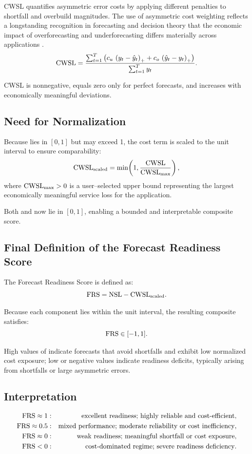 CWSL quantifies asymmetric error costs by applying different penalties to
shortfall and overbuild magnitudes. The use of asymmetric cost weighting reflects
a longstanding recognition in forecasting and decision theory that the economic
impact of overforecasting and underforecasting differs materially across
applications \citep{granger1969}.
\[
\text{CWSL} =
\frac{
\sum_{t=1}^T
\left(
    c_u \, \left(y_t - \hat{y}_t\right)_{+}
    +
    c_o \, \left(\hat{y}_t - y_t\right)_{+}
\right)
}{
\sum_{t=1}^T y_t
}.
\]

CWSL is nonnegative, equals zero only for perfect forecasts, and increases with
economically meaningful deviations.

\subsection{Need for Normalization}

Because \NSL{} lies in \([0,1]\) but \CWSL{} may exceed 1, the cost term is scaled
to the unit interval to ensure comparability:
\[
\mathrm{CWSL}_{\mathrm{scaled}}
    = \min\!\left( 1, \frac{\text{CWSL}}{\mathrm{CWSL}_{\max}} \right),
\]
where \(\mathrm{CWSL}_{\max} > 0\) is a user–selected upper bound representing the largest
economically meaningful service loss for the application.

Both \NSL{} and \CWSLscaled{} now lie in \([0,1]\), enabling a bounded and
interpretable composite score.



\subsection{Final Definition of the Forecast Readiness Score}

The Forecast Readiness Score is defined as:
\[
\mathrm{FRS} = \text{NSL} - \mathrm{CWSL}_{\mathrm{scaled}}.
\]

Because each component lies within the unit interval, the resulting composite
satisfies:
\[
\mathrm{FRS} \in [-1, 1].
\]

High values of \FRS{} indicate forecasts that avoid shortfalls and exhibit low
normalized cost exposure; low or negative values indicate readiness deficits,
typically arising from shortfalls or large asymmetric errors.

\subsection{Interpretation}

\[
\begin{aligned}
\mathrm{FRS} \approx 1   &:& \text{excellent readiness; highly reliable and cost-efficient}, \\
\mathrm{FRS} \approx 0.5 &:& \text{mixed performance; moderate reliability or cost inefficiency}, \\
\mathrm{FRS} \approx 0   &:& \text{weak readiness; meaningful shortfall or cost exposure}, \\
\mathrm{FRS} < 0         &:& \text{cost-dominated regime; severe readiness deficiency}.
\end{aligned}
\]
